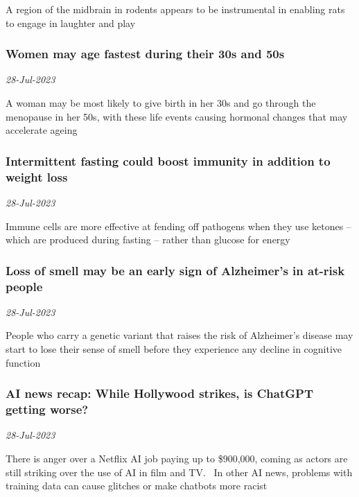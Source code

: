 A region of the midbrain in rodents appears to be instrumental in enabling rats to engage in laughter and play
\subsubsection{Women may age fastest during their 30s and 50s \href{https://www.newscientist.com/article/2384445-women-may-age-fastest-during-their-30s-and-50s/?utm_campaign=RSS%7CNSNS&utm_source=NSNS&utm_medium=RSS&utm_content=home}{\ding{225}}}
\textit{28-Jul-2023}

A woman may be most likely to give birth in her 30s and go through the menopause in her 50s, with these life events causing hormonal changes that may accelerate ageing
\subsubsection{Intermittent fasting could boost immunity in addition to weight loss \href{https://www.newscientist.com/article/2385137-intermittent-fasting-could-boost-immunity-in-addition-to-weight-loss/?utm_campaign=RSS%7CNSNS&utm_source=NSNS&utm_medium=RSS&utm_content=home}{}}
\textit{28-Jul-2023}

Immune cells are more effective at fending off pathogens when they use ketones – which are produced during fasting – rather than glucose for energy
\subsubsection{Loss of smell may be an early sign of Alzheimer's in at-risk people \href{https://www.newscientist.com/article/2384964-loss-of-smell-may-be-an-early-sign-of-alzheimers-in-at-risk-people/?utm_campaign=RSS%7CNSNS&utm_source=NSNS&utm_medium=RSS&utm_content=home}{\ding{225}}}
\textit{28-Jul-2023}

People who carry a genetic variant that raises the risk of Alzheimer's disease may start to lose their sense of smell before they experience any decline in cognitive function
\subsubsection{AI news recap: While Hollywood strikes, is ChatGPT getting worse? \href{https://www.newscientist.com/article/2384188-ai-news-recap-while-hollywood-strikes-is-chatgpt-getting-worse/?utm_campaign=RSS%7CNSNS&utm_source=NSNS&utm_medium=RSS&utm_content=home}{}}
\textit{28-Jul-2023}

There is anger over a Netflix AI job paying up to \$900,000, coming as actors are still striking over the use of AI in film and TV.  In other AI news, problems with training data can cause glitches or make chatbots more racist
